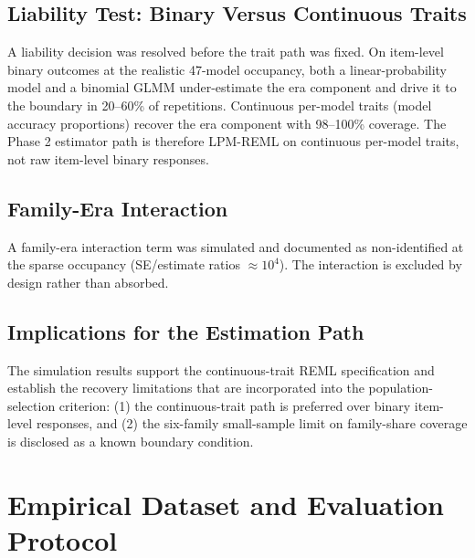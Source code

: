 \documentclass{ieeeaccess}
\theoremstyle{definition}
\theoremstyle{plain}
\begin{document}
\subsection{Liability Test: Binary Versus Continuous Traits}
A liability decision was resolved before the trait path was fixed. On item-level binary outcomes at the realistic 47-model occupancy, both a linear-probability model and a binomial GLMM under-estimate the era component and drive it to the boundary in 20--60\% of repetitions. Continuous per-model traits (model accuracy proportions) recover the era component with 98--100\% coverage. The Phase 2 estimator path is therefore LPM-REML on continuous per-model traits, not raw item-level binary responses.

\subsection{Family-Era Interaction}
A family-era interaction term was simulated and documented as non-identified at the sparse occupancy (SE/estimate ratios $\approx 10^4$). The interaction is excluded by design rather than absorbed.

\subsection{Implications for the Estimation Path}
The simulation results support the continuous-trait REML specification and establish the recovery limitations that are incorporated into the population-selection criterion: (1) the continuous-trait path is preferred over binary item-level responses, and (2) the six-family small-sample limit on family-share coverage is disclosed as a known boundary condition.

\section{Empirical Dataset and Evaluation Protocol}
\label{sec:empirical}
\end{document}
